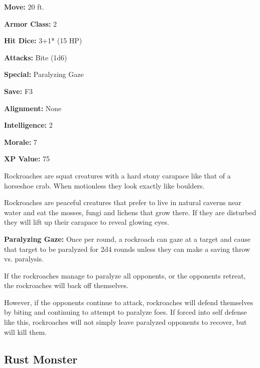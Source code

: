 \begin{multicols*}{2}
{\textbf{Move:} 20 ft.

\textbf{Armor Class:} 2

\textbf{Hit Dice:} 3+1* (15 HP)

\textbf{Attacks:} Bite (1d6)

\textbf{Special:} Paralyzing Gaze

\textbf{Save:} F3

\textbf{Alignment:} None

\textbf{Intelligence:} 2

\textbf{Morale:} 7

\textbf{XP Value:} 75}

Rockroaches are squat creatures with a hard stony carapace like that of a horseshoe crab. When motionless they look exactly like boulders.

Rockroaches are peaceful creatures that prefer to live in natural caverns near water and eat the mosses, fungi and lichens that grow there. If they are disturbed they will lift up their carapace to reveal glowing eyes.

\textbf{Paralyzing Gaze:} Once per round, a rockroach can gaze at a target and cause that target to be paralyzed for 2d4 rounds unless they can make a saving throw vs. paralysis.

If the rockroaches manage to paralyze all opponents, or the opponents retreat, the rockroaches will back off themselves.

However, if the opponents continue to attack, rockroaches will defend themselves by biting and continuing to attempt to paralyze foes. If forced into self defense like this, rockroaches will not simply leave paralyzed opponents to recover, but will kill them.

\subsection{Rust Monster}
\end{multicols*}
